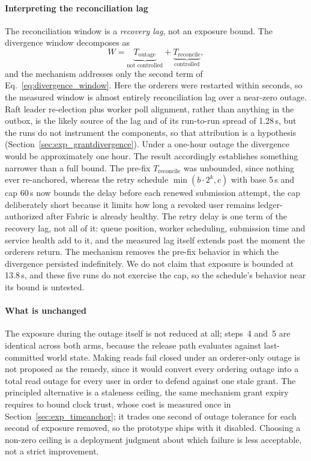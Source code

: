 \documentclass[preprint,12pt]{elsarticle}
\begin{document}
\paragraph{Interpreting the reconciliation lag}
The reconciliation window is a \emph{recovery lag}, not an exposure bound. The divergence window
decomposes as
\begin{equation}
  W = \underbrace{T_{\text{outage}}}_{\text{not controlled}}
    + \underbrace{T_{\text{reconcile}}}_{\text{controlled}},
  \label{eq:divergence_window}
\end{equation}
and the mechanism addresses only the second term of
Eq.~\ref{eq:divergence_window}. Here the orderers were
restarted within seconds, so the measured window is almost entirely
reconciliation lag over a near-zero outage. Raft leader re-election plus
worker poll alignment, rather than anything in the outbox, is the likely
source of the lag and of its run-to-run spread of 1.28\,s, but the runs do
not instrument the components, so that attribution is a hypothesis
(Section~\ref{sec:exp_grantdivergence}). Under a one-hour outage the divergence would be
approximately one hour. The result accordingly establishes something narrower
than a full bound. The pre-fix $T_{\text{reconcile}}$ was unbounded, since
nothing ever re-anchored, whereas the retry schedule
$\min(b \cdot 2^{k}, c)$ with base 5\,s and cap 60\,s now bounds the delay
before each renewed submission attempt, the cap deliberately short because it
limits how long a revoked user remains ledger-authorized after Fabric is
already healthy. The retry delay is one term of the recovery lag, not all of
it: queue position, worker scheduling, submission time and service health add
to it, and the measured lag itself extends past the moment the orderers
return. The mechanism removes the pre-fix behavior in which the
divergence persisted indefinitely. We do not
claim that exposure is bounded at 13.8\,s, and these five runs do not
exercise the cap, so the schedule's behavior near its bound is untested.

\paragraph{What is unchanged}
The exposure during the outage itself is not reduced at all; steps~4 and~5
are identical across both arms, because the release path evaluates against
last-committed world state. Making reads fail closed under an orderer-only
outage is not proposed as the remedy, since it would convert every ordering
outage into a total read outage for every user in order to defend against one
stale grant. The principled alternative is a staleness ceiling, the same
mechanism grant expiry requires to bound clock trust, whose cost is measured
once in Section~\ref{sec:exp_timeanchor}; it trades one second of outage
tolerance for each second of exposure removed, so the prototype ships with it
disabled. Choosing a non-zero ceiling is a deployment judgment
about which failure is less acceptable, not a strict improvement.
\end{document}
